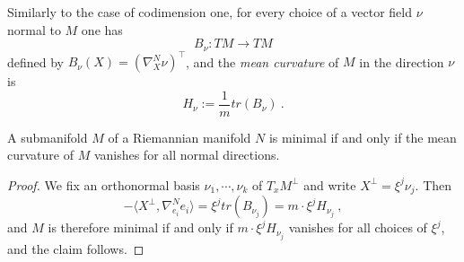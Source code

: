Similarly to the case of codimension one, for every choice of a vector field $\nu$ normal to $M$ one has
\[
    B_\nu : TM \to TM
\]
defined by $B_\nu(X) = (\nabla^N_X \nu)^\top$, and the \textit{mean curvature} of $M$ in the direction $\nu$ is
\[
    H_\nu := \frac{1}{m} tr(B_\nu) \ .
\]
\begin{theorem}
    A submanifold $M$ of a Riemannian manifold $N$ is minimal if and only if the mean curvature of $M$ vanishes for all normal directions.
\end{theorem}
\begin{proof}
    We fix an orthonormal basis $\nu_1 , \cdots, \nu_k$ of $T_x M^\perp$ and write $X^\perp = \xi^j \nu_j$.
    Then
    \[
        -\langle X^\perp , \nabla^N_{e_i} e_i \rangle = \xi^j tr(B_{\nu_j}) = m \cdot \xi^j H_{\nu_j} \ ,
    \]
    and $M$ is therefore minimal if and only if $m \cdot \xi^j H_{\nu_j}$ vanishes for all choices of $\xi^j$, and the claim follows.
\end{proof}

